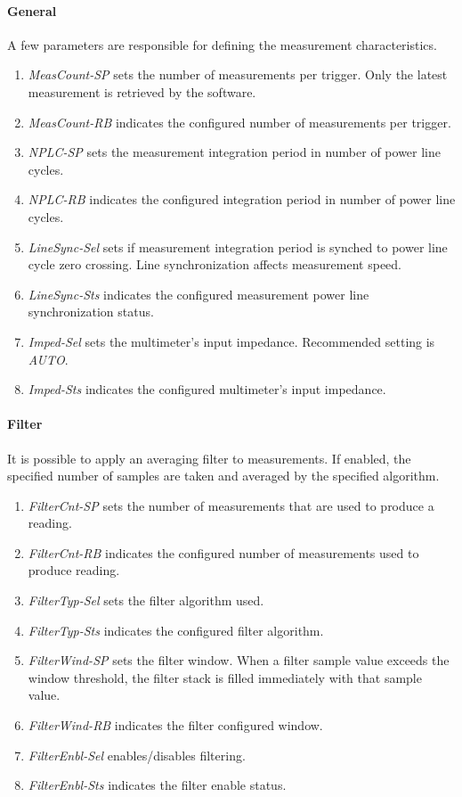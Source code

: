 \documentclass[openany]{article}
\begin{document}
		\paragraph{General} A few parameters are responsible for defining the measurement characteristics.

			\begin{enumerate}
				\item \emph{MeasCount-SP} sets the number of measurements per trigger. Only the latest measurement is retrieved by the software.
				\item \emph{MeasCount-RB} indicates the configured number of measurements per trigger.
				\item \emph{NPLC-SP} sets the measurement integration period in number of power line cycles.
				\item \emph{NPLC-RB} indicates the configured integration period in number of power line cycles.
				\item \emph{LineSync-Sel} sets if measurement integration period is synched to power line cycle zero crossing. Line synchronization affects measurement speed.
				\item \emph{LineSync-Sts} indicates the configured measurement power line synchronization status.
				\item \emph{Imped-Sel} sets the multimeter's input impedance. Recommended setting is \emph{AUTO}.
				\item \emph{Imped-Sts} indicates the configured multimeter's input impedance.
			\end{enumerate}

		\paragraph{Filter} It is possible to apply an averaging filter to measurements. If enabled, the specified number of samples are taken and averaged by the specified algorithm.

			\begin{enumerate}
				\item \emph{FilterCnt-SP} sets the number of measurements that are used to produce a reading.
				\item \emph{FilterCnt-RB} indicates the configured number of measurements used to produce reading.
				\item \emph{FilterTyp-Sel} sets the filter algorithm used.
				\item \emph{FilterTyp-Sts} indicates the configured filter algorithm.
				\item \emph{FilterWind-SP} sets the filter window. When a filter sample value exceeds the window threshold, the filter stack is filled immediately with that sample value.
				\item \emph{FilterWind-RB} indicates the filter configured window.
				\item \emph{FilterEnbl-Sel} enables/disables filtering.
				\item \emph{FilterEnbl-Sts} indicates the filter enable status.
			\end{enumerate}
\end{document}
